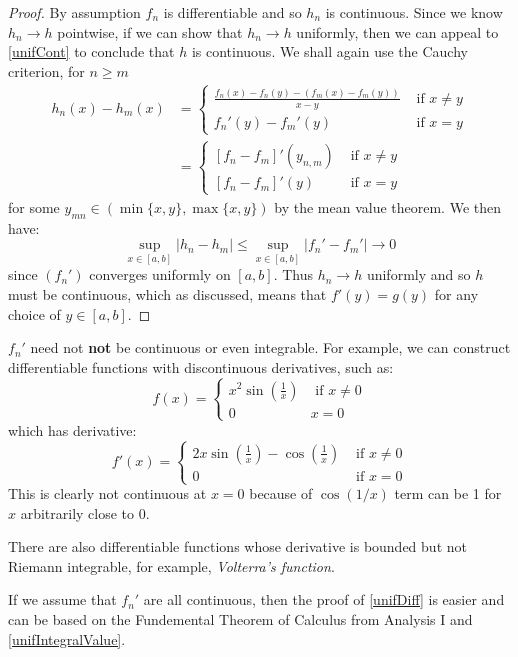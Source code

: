 \documentclass[../main.tex]{subfiles}
\begin{document}
\begin{proof}
  By assumption $f_n$ is differentiable and so $h_n$ is continuous.
  Since we know $h_n \to h$ pointwise, if we can show that $h_n \to h$ uniformly, then we can appeal to \cref{unifCont} to conclude that $h$ is continuous.
  We shall again use the Cauchy criterion, for $n \geq m$
  \begin{align*}
    h_n(x) - h_m(x) &= \begin{cases}
    \frac{f_n(x) - f_n(y) - (f_m(x) - f_m(y))}{x - y} & \text{ if } x \neq y \\
    f_n'(y) - f_m'(y) & \text{ if } x = y
    \end{cases} \\
                    &= \begin{cases}
                      [f_n - f_m]'(y_{n, m}) &  \text{ if } x \neq y\\
                      [f_n - f_m]'(y) & \text{ if } x = y
                    \end{cases}
  \end{align*}
  for some $y_{m n} \in (\min\{x, y\}, \max\{x, y\})$ by the mean value theorem.
  We then have:
  \[
    \sup_{x \in [a, b]} |h_n - h_m| \leq \sup_{x \in [a, b]} |f_n' - f_m'| \to 0
  \]
  since $(f_n')$ converges uniformly on $[a, b]$.
  Thus $h_n \to h$ uniformly and so $h$ must be continuous, which as discussed, means that $f'(y) = g(y)$ for any choice of $y \in [a, b]$.
\end{proof}
\begin{remark}
  $f_n'$ need not \textbf{not} be continuous or even integrable.
  For example, we can construct differentiable functions with discontinuous derivatives, such as:
  \[
    f(x) = \begin{cases}
    x^2 \sin(\frac{1}{x}) & \text{ if } x \neq 0 \\
    0 & x = 0
    \end{cases}
  \]
  which has derivative:
  \[
    f'(x) = \begin{cases}
    2x \sin(\frac{1}{x}) - \cos(\frac{1}{x}) & \text{ if } x \neq 0 \\
    0 &  \text{ if } x = 0
    \end{cases}
  \]
  This is clearly not continuous at $x = 0$ because of $\cos(1/x)$ term can be 1 for $x$ arbitrarily close to 0.

  There are also differentiable functions whose derivative is bounded but not Riemann integrable, for example, \textit{Volterra's function}.
\end{remark}
If we assume that $f_n'$ are all continuous, then the proof of \cref{unifDiff} is easier and can be based on the Fundemental Theorem of Calculus from Analysis I and \cref{unifIntegralValue}.
\end{document}
